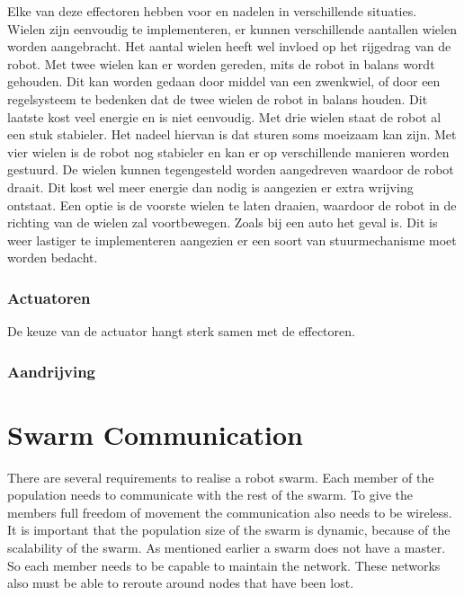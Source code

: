 \documentclass[10pt,a4paper]{article}
\begin{document}
  
Elke van deze effectoren hebben voor en nadelen in verschillende situaties.\\Wielen zijn eenvoudig te implementeren, er kunnen verschillende aantallen wielen worden aangebracht. Het aantal wielen heeft wel invloed op het rijgedrag van de robot. Met twee wielen kan er worden gereden, mits de robot in balans wordt gehouden. Dit kan worden gedaan door middel van een zwenkwiel, of door een regelsysteem te bedenken dat de twee wielen de robot in balans houden. Dit laatste kost veel energie en is niet eenvoudig. Met drie wielen staat de robot al een stuk stabieler. Het nadeel hiervan is dat sturen soms moeizaam kan zijn. Met vier wielen is de robot nog stabieler en kan er op verschillende manieren worden gestuurd. De wielen kunnen tegengesteld worden aangedreven waardoor de robot draait. Dit kost wel meer energie dan nodig is aangezien er extra wrijving ontstaat. Een optie is de voorste wielen te laten draaien, waardoor de robot in de richting van de wielen zal voortbewegen. Zoals bij een auto het geval is. Dit is weer lastiger te implementeren aangezien er een soort van stuurmechanisme moet worden bedacht. 

\subsubsection{Actuatoren}

De keuze van de actuator hangt sterk samen met de effectoren.

\subsubsection{Aandrijving}

\newpage
\section{Swarm Communication}
There are several requirements to realise a robot swarm. Each member of the population needs to communicate with the rest of the swarm. To give the members full freedom of movement the communication also needs to be wireless. It is important that the population size of the swarm is dynamic, because of the scalability of the swarm. As mentioned earlier a swarm does not have a master. So each member needs to be capable to maintain the network. These networks also must be able to reroute around nodes that have been lost.
\end{document}
